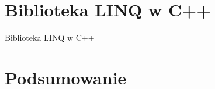 \documentclass{pracamgr}
\begin{document}
\chapter{Biblioteka LINQ w C++}\label{r:Biblioteka}

Biblioteka LINQ w C++


\chapter{Podsumowanie}


\appendix
\listoffigures 
{} 
\printbibliography
\printindex
\end{document}

